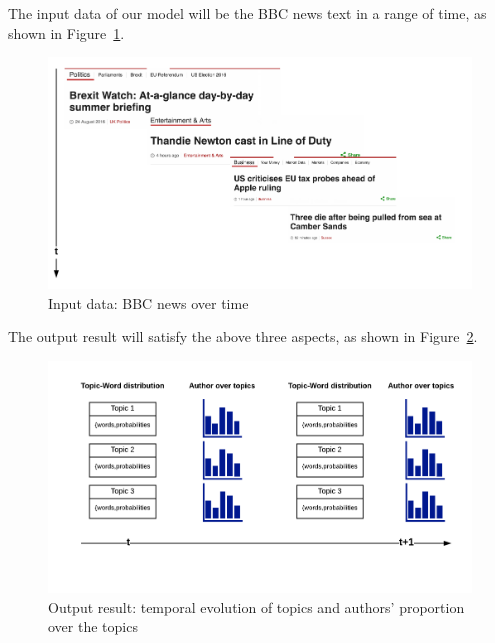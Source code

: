 The input data of our model will be the BBC news text in a range of time, as shown in Figure~\ref{fig:input}.

\begin{figure}[h]
\centering
\includegraphics[width=\textwidth]{figures/input.png}
\caption{Input data: BBC news over time}
\label{fig:input}
\end{figure}
The output result will satisfy the above three aspects, as shown in Figure~\ref{fig:output}.
\begin{figure}[h]
\centering
\includegraphics[width=\textwidth]{figures/output.png}
\caption{Output result: temporal evolution of topics and authors’ proportion over the topics }
\label{fig:output}
\end{figure}



